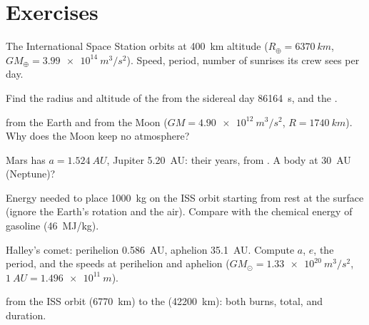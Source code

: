 \section{Exercises}

\begin{exercise}[$\star$]\label{exo:b1:central-forces:1}
The International Space Station orbits at \qty{400}{km} altitude
($R_\oplus = \qty{6370}{km}$, $GM_\oplus = \qty{3.99e14}{m^3/s^2}$). Speed,
period, number of sunrises its crew sees per day.
\end{exercise}

\begin{exercise}[$\star$]\label{exo:b1:central-forces:2}
Find the radius and altitude of the  from the
sidereal day \qty{86164}{s}, and the .
\end{exercise}

\begin{exercise}[$\star$]\label{exo:b1:central-forces:3}
 from the Earth and from the Moon ($GM = \qty{4.90e12}{m^3/s^2}$,
$R = \qty{1740}{km}$). Why does the Moon keep no atmosphere?
\end{exercise}

\begin{exercise}[$\star$]\label{exo:b1:central-forces:4}
Mars has $a = \qty{1.524}{AU}$, Jupiter \qty{5.20}{AU}: their years, from
. A body at \qty{30}{AU} (Neptune)?
\end{exercise}

\begin{exercise}[$\star\star$]\label{exo:b1:central-forces:5}
Energy needed to place \qty{1000}{kg} on the ISS orbit starting from
rest at the surface (ignore the Earth's rotation and the air). Compare
with the chemical energy of gasoline (\qty{46}{MJ/kg}).
\end{exercise}

\begin{exercise}[$\star\star$]\label{exo:b1:central-forces:6}
Halley's comet: perihelion \qty{0.586}{AU}, aphelion \qty{35.1}{AU}.
Compute $a$, $e$, the period, and the speeds at perihelion and aphelion
($GM_\odot = \qty{1.33e20}{m^3/s^2}$, $\qty{1}{AU} = \qty{1.496e11}{m}$).
\end{exercise}

\begin{exercise}[$\star\star$]\label{exo:b1:central-forces:7}
 from the ISS orbit (\qty{6770}{km}) to the
 (\qty{42200}{km}): both burns, total, and duration.
\end{exercise}

